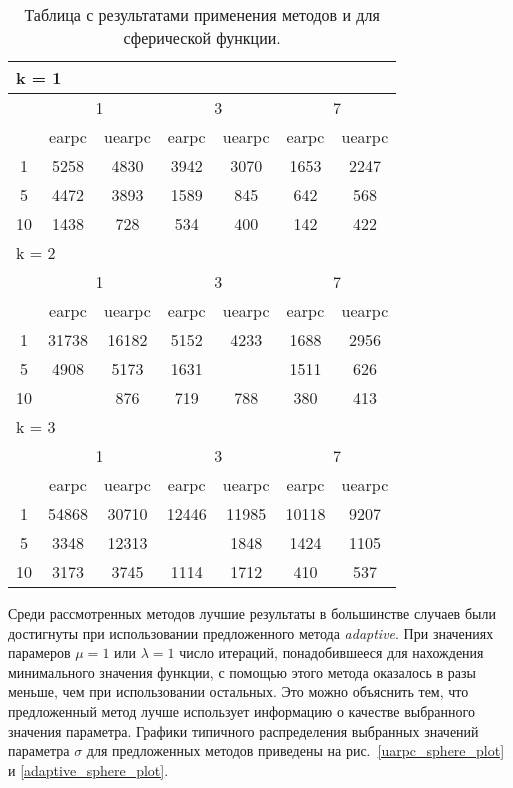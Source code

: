 \begin{table}
  \centering
  \begin{tabular}{|*7{c|}}
    \hline
    \multicolumn{7}{|l|}{k = 1} \\
    \hline
    \multirow{2}{*}{\diagbox{$\mu$}{$\lambda$}} & \multicolumn{2}{c|}{1} & \multicolumn{2}{c|}{3} & \multicolumn{2}{c|}{7} \\
    \cline{2-7}
    & earpc & uearpc & earpc & uearpc & earpc & uearpc \\
    \hline
    1 & 5258 & 4830 & 3942 & 3070 & 1653 & 2247 \\
    \hline
    5 & 4472 & 3893 & 1589 & 845 & 642& 568 \\
    \hline
    10 & 1438 & 728 & 534 & 400& 142 & 422 \\
    \hline
    \multicolumn{7}{|l|}{k = 2} \\
    \hline
    \multirow{2}{*}{\diagbox{$\mu$}{$\lambda$}} & \multicolumn{2}{c|}{1} & \multicolumn{2}{c|}{3} & \multicolumn{2}{c|}{7} \\
    \cline{2-7}
    & earpc & uearpc & earpc & uearpc & earpc & uearpc \\
    \hline
    1 & 31738 & 16182 & 5152 & 4233 & 1688 & 2956 \\
    \hline
    5 & 4908 & 5173 & 1631& \cellcolor{olive}{946} & 1511 & 626 \\
    \hline
    10& \cellcolor{olive}{778} & 876 & 719 & 788 & 380 & 413 \\
    \hline
    \multicolumn{7}{|l|}{k = 3} \\
    \hline
    \multirow{2}{*}{\diagbox{$\mu$}{$\lambda$}} & \multicolumn{2}{c|}{1} & \multicolumn{2}{c|}{3} & \multicolumn{2}{c|}{7} \\
    \cline{2-7}
    & earpc & uearpc & earpc & uearpc & earpc & uearpc \\
    \hline
    1 & 54868 & 30710 & 12446 & 11985 & 10118 & 9207 \\
    \hline
    5 & 3348 & 12313& \cellcolor{olive}{1379} & 1848 & 1424 & 1105 \\
    \hline
    10 & 3173 & 3745 & 1114 & 1712 & 410 & 537 \\
    \hline
  \end{tabular}
  \captionsetup{justification=centering}
  \caption{Таблица с результатами применения методов  и  для сферической функции.}
  \label{earpc_sphere_results}
\end{table}

Среди рассмотренных методов лучшие результаты в большинстве случаев были достигнуты при использовании предложенного метода \textit{adaptive}. При значениях парамеров $\mu = 1$ или $\lambda = 1$ число итераций, понадобившееся для нахождения минимального значения функции, с помощью этого метода оказалось в разы меньше, чем при использовании остальных. Это можно объяснить тем, что предложенный метод лучше использует информацию о качестве выбранного значения параметра. Графики типичного распределения выбранных значений параметра $\sigma$ для предложенных методов приведены на рис.~\ref{uarpc_sphere_plot} и \ref{adaptive_sphere_plot}.

